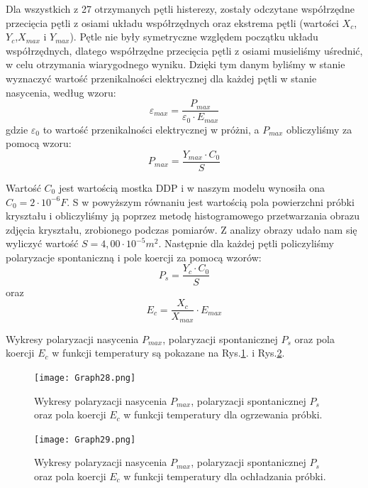 \documentclass{article}
\begin{document}
Dla wszystkich z 27 otrzymanych pętli histerezy, zostały odczytane współrzędne przecięcia pętli z osiami układu współrzędnych oraz ekstrema pętli (wartości $X_{c}$,$Y_{c}$,$X_{max}$ i $Y_{max}$). Pętle nie były symetryczne względem początku układu współrzędnych, dlatego współrzędne przecięcia pętli z osiami musieliśmy uśrednić, w celu otrzymania wiarygodnego wyniku. Dzięki tym danym byliśmy w stanie wyznaczyć wartość przenikalności elektrycznej dla każdej pętli w stanie nasycenia, według wzoru:
\begin{equation}
\varepsilon_{max}=\dfrac{P_{max}}{\varepsilon_{0}\cdot E_{max}}
\end{equation}
gdzie $\varepsilon_{0}$ to wartość przenikalności elektrycznej w próżni, a $P_{max}$ obliczyliśmy za pomocą wzoru:
\begin{equation}
P_{max}=\dfrac{Y_{max}\cdot C_{0}}{S}
\end{equation}

Wartość $C_{0}$ jest wartością mostka DDP i w naszym modelu wynosiła ona $C_{0}=2\cdot10^{-6} F$. S w powyższym równaniu jest wartością pola powierzchni próbki kryształu i obliczyliśmy ją poprzez metodę histogramowego przetwarzania obrazu zdjęcia kryształu, zrobionego podczas pomiarów. Z analizy obrazy udało nam się wyliczyć wartość $S=4,00\cdot10^{-5} m^{2}$. Następnie dla każdej pętli policzyliśmy polaryzacje spontaniczną i pole koercji za pomocą wzorów:
\begin{equation}
P_{s}=\dfrac{Y_{c}\cdot C_{0}}{S}
\end{equation}
oraz 
\begin{equation}
E_{c}=\dfrac{X_{c}}{X_{max}}\cdot E_{max}
\end{equation}

Wykresy polaryzacji nasycenia $P_{max}$, polaryzacji spontanicznej $P_{s}$ oraz pola koercji $E_{c}$ w funkcji temperatury są pokazane na Rys.\ref{fig:Graph28}. i Rys.\ref{fig:Graph29}.

\begin{figure}[!h]
	\centering
	\texttt{[image: Graph28.png]}
	\caption{Wykresy polaryzacji nasycenia $P_{max}$, polaryzacji spontanicznej $P_{s}$ oraz pola koercji $E_{c}$ w funkcji temperatury dla ogrzewania próbki.}
	\label{fig:Graph28}
\end{figure}
\begin{figure}[!h]
	\centering
	\texttt{[image: Graph29.png]}
	\caption{Wykresy polaryzacji nasycenia $P_{max}$, polaryzacji spontanicznej $P_{s}$ oraz pola koercji $E_{c}$ w funkcji temperatury dla ochładzania próbki.}
	\label{fig:Graph29}
\end{figure}
\end{document}
